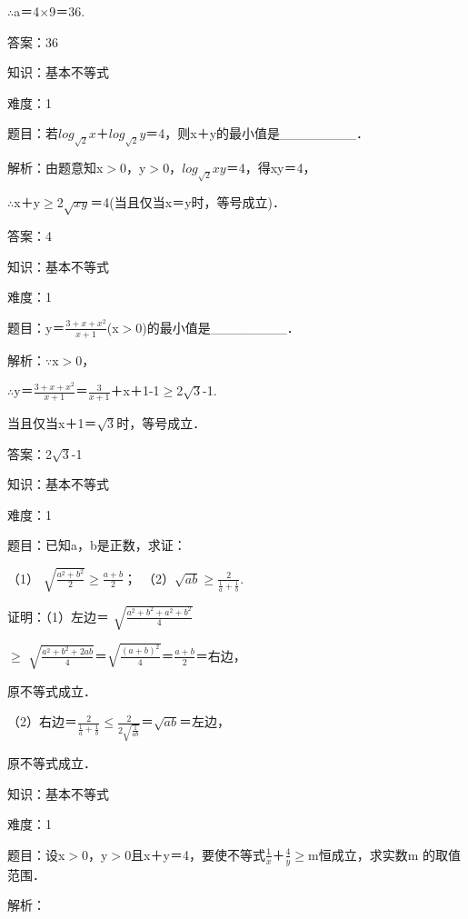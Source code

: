 \documentclass{article} %
\begin{document}
$\mathrm{\therefore}$a＝4$\mathrm{\times}$9＝36.

答案：36



知识：基本不等式

难度：1

题目：若$log_{\sqrt{2}}x$＋$log_{\sqrt{2}}y$＝4，则x＋y的最小值是\_\_\_\_\_\_\_\_．

解析：由题意知x$\mathrm{>}$0，y$\mathrm{>}$0，$log_{\sqrt{2}}{xy}$＝4，得xy＝4，

$\mathrm{\therefore}$x＋y$\mathrm{\ge}$2$\sqrt{xy}$＝4(当且仅当x＝y时，等号成立)．

答案：4



知识：基本不等式

难度：1

题目：y＝$\frac{3+x+x^2}{x+1}$(x$\mathrm{>}$0)的最小值是\_\_\_\_\_\_\_\_．

解析：$\mathrm{\because}$x$\mathrm{>}$0，

$\mathrm{\therefore}$y＝$\frac{3+x+x^2}{x+1}$＝$\frac{3}{x+1}$＋x＋1-1$\mathrm{\ge}$2$\sqrt{3}$-1.

当且仅当x＋1＝$\sqrt{3}$时，等号成立．

答案：2$\sqrt{3}$-1



知识：基本不等式

难度：1

题目：已知a，b是正数，求证：

（1） $\sqrt{\frac{a^2+b^2}{2}}$$\mathrm{\ge}$$\frac{a+b}{2}$；　（2）$\sqrt{ab}$$\mathrm{\ge}$$\frac{2}{\frac{1}{a}+\frac{1}{b}}$.

证明：（1）左边＝ $\sqrt{\frac{a^2+b^2+a^2+b^2}{4}}$

$\mathrm{\ge}$ $\sqrt{\frac{a^2+b^2+2ab}{4}}$＝$\sqrt{\frac{(a+b)^2}{4}}$＝$\frac{a+b}{2}$＝右边，

原不等式成立．

（2）右边＝$\frac{2}{\frac{1}{a}+\frac{1}{b}}$$\mathrm{\le}$$\frac{2}{2\sqrt{\frac{1}{ab}}}$＝$\sqrt{ab}$＝左边，

原不等式成立．



知识：基本不等式

难度：1

题目：设x$\mathrm{>}$0，y$\mathrm{>}$0且x＋y＝4，要使不等式$\frac{1}{x}$＋$\frac{4}{y}$$\mathrm{\ge}$m恒成立，求实数m 的取值范围．

解析：
\end{document}
